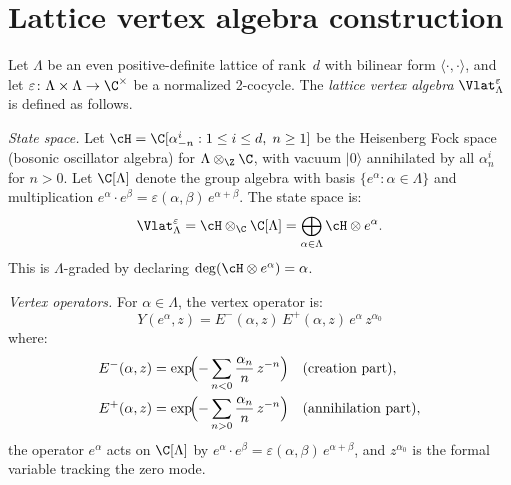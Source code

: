 
\section{Lattice vertex algebra construction}
\label{sec:lattice:construction}

\begin{construction}\label{constr:lattice:va}
Let $\Lambda$ be an even positive-definite lattice of rank~$d$ with
bilinear form $\langle \cdot, \cdot \rangle$, and let
$\varepsilon \colon \Lambda \times \Lambda \to \C^\times$ be a
normalized 2-cocycle. The \emph{lattice vertex algebra}
$\Vlat_\Lambda^\varepsilon$ is defined as follows.

\noindent\emph{State space.}
Let $\cH = \C[\alpha^i_{-n} : 1 \leq i \leq d,\; n \geq 1]$ be the
Heisenberg Fock space (bosonic oscillator algebra) for
$\Lambda \otimes_\Z \C$, with vacuum $|0\rangle$ annihilated by all
$\alpha^i_n$ for $n > 0$. Let $\C[\Lambda]$ denote the group algebra
with basis $\{e^\alpha : \alpha \in \Lambda\}$ and multiplication
$e^\alpha \cdot e^\beta = \varepsilon(\alpha,\beta)\, e^{\alpha+\beta}$.
The state space is:
\begin{equation}\label{eq:lattice:state-space}
\Vlat_\Lambda^\varepsilon
= \cH \otimes_\C \C[\Lambda]
= \bigoplus_{\alpha \in \Lambda} \cH \otimes e^\alpha.
\end{equation}
This is $\Lambda$-graded by declaring
$\deg(\cH \otimes e^\alpha) = \alpha$.

\noindent\emph{Vertex operators.}
For $\alpha \in \Lambda$, the vertex operator is:
\begin{equation}\label{eq:lattice:vertex-op}
Y(e^\alpha, z) = E^-(\alpha, z)\, E^+(\alpha, z)\, e^\alpha\, z^{\alpha_0}
\end{equation}
where:
\begin{align*}
E^-(\alpha, z)
&= \exp\!\Bigl(-\sum_{n < 0} \frac{\alpha_n}{n}\, z^{-n}\Bigr)
 \quad \text{(creation part)}, \\
E^+(\alpha, z)
&= \exp\!\Bigl(-\sum_{n > 0} \frac{\alpha_n}{n}\, z^{-n}\Bigr)
 \quad \text{(annihilation part)},
\end{align*}
the operator $e^\alpha$ acts on $\C[\Lambda]$ by
$e^\alpha \cdot e^\beta = \varepsilon(\alpha,\beta)\,e^{\alpha+\beta}$,
and $z^{\alpha_0}$ is the formal variable tracking the zero mode.


\end{construction}
